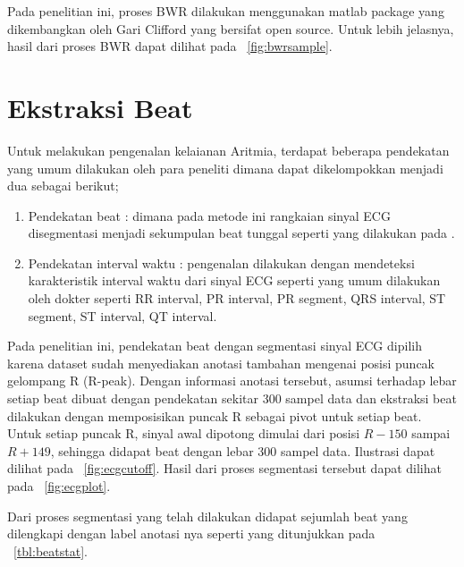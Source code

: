 Pada penelitian ini, proses BWR dilakukan menggunakan matlab package yang
dikembangkan oleh Gari Clifford \cite{Clifford:2005} yang bersifat open source.
Untuk lebih jelasnya, hasil dari proses BWR dapat dilihat pada
\pic~\ref{fig:bwrsample}.

\section{Ekstraksi Beat}
\label{sec:ekstractbeat}
Untuk melakukan pengenalan kelaianan Aritmia, terdapat beberapa pendekatan yang
umum dilakukan oleh para peneliti dimana dapat dikelompokkan menjadi dua sebagai
berikut;
\begin{enumerate}
  \item Pendekatan beat : dimana pada metode ini rangkaian sinyal ECG 
  disegmentasi menjadi sekumpulan beat tunggal seperti yang dilakukan pada
  \cite{Zhao:2005, Ghongade:2007}. 
  \item Pendekatan interval waktu : pengenalan dilakukan dengan mendeteksi
  karakteristik interval waktu dari sinyal ECG seperti yang umum
  dilakukan oleh dokter seperti RR interval, PR interval, PR segment, QRS
  interval, ST segment, ST interval, QT interval.
\end{enumerate}


Pada penelitian ini, pendekatan beat dengan segmentasi sinyal ECG dipilih karena
dataset sudah menyediakan anotasi tambahan mengenai posisi puncak gelompang R
(R-peak). Dengan informasi anotasi tersebut, asumsi terhadap lebar setiap beat
dibuat dengan pendekatan sekitar 300 sampel data dan ekstraksi beat dilakukan
dengan memposisikan puncak R sebagai pivot untuk setiap beat. Untuk setiap
puncak R, sinyal awal dipotong dimulai dari posisi $R-150$ sampai $R+149$,
sehingga didapat beat dengan lebar 300 sampel data. Ilustrasi dapat dilihat pada
\pic~\ref{fig:ecgcutoff}. Hasil dari proses segmentasi tersebut dapat dilihat
pada \pic~\ref{fig:ecgplot}.


Dari proses segmentasi yang telah dilakukan didapat sejumlah beat yang
dilengkapi dengan label anotasi nya seperti yang ditunjukkan pada
\tab~\ref{tbl:beatstat}.

